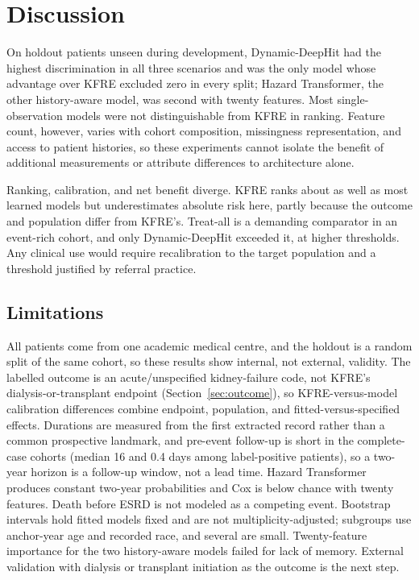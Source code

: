 \section{Discussion}\label{sec:discussion}

On holdout patients unseen during development, Dynamic-DeepHit had the highest discrimination in all three scenarios and was the only model whose advantage over KFRE excluded zero in every split; Hazard Transformer, the other history-aware model, was second with twenty features. Most single-observation models were not distinguishable from KFRE in ranking. Feature count, however, varies with cohort composition, missingness representation, and access to patient histories, so these experiments cannot isolate the benefit of additional measurements or attribute differences to architecture alone.

Ranking, calibration, and net benefit diverge. KFRE ranks about as well as most learned models but underestimates absolute risk here, partly because the outcome and population differ from KFRE's. Treat-all is a demanding comparator in an event-rich cohort, and only Dynamic-DeepHit exceeded it, at higher thresholds. Any clinical use would require recalibration to the target population and a threshold justified by referral practice.

\subsection{Limitations}\label{sec:limitations}
All patients come from one academic medical centre, and the holdout is a random split of the same cohort, so these results show internal, not external, validity. The labelled outcome is an acute/unspecified kidney-failure code, not KFRE's dialysis-or-transplant endpoint (Section~\ref{sec:outcome}), so KFRE-versus-model calibration differences combine endpoint, population, and fitted-versus-specified effects. Durations are measured from the first extracted record rather than a common prospective landmark, and pre-event follow-up is short in the complete-case cohorts (median 16 and 0.4 days among label-positive patients), so a two-year horizon is a follow-up window, not a lead time. Hazard Transformer produces constant two-year probabilities and Cox is below chance with twenty features. Death before ESRD is not modeled as a competing event. Bootstrap intervals hold fitted models fixed and are not multiplicity-adjusted; subgroups use anchor-year age and recorded race, and several are small. Twenty-feature importance for the two history-aware models failed for lack of memory. External validation with dialysis or transplant initiation as the outcome is the next step.
